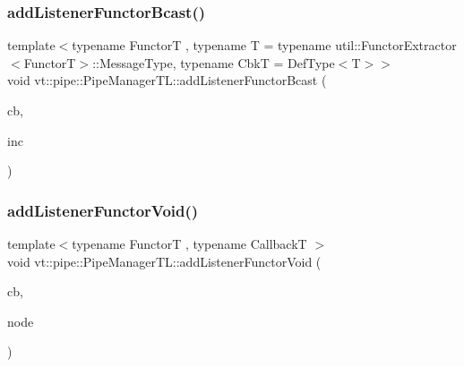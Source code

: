 \subsubsection{\texorpdfstring{add\+Listener\+Functor\+Bcast()}{addListenerFunctorBcast()}\hspace{0.1cm}{\footnotesize\ttfamily [2/2]}}
{\footnotesize\ttfamily template$<$typename FunctorT , typename T  = typename util\+::\+Functor\+Extractor$<$\+Functor\+T$>$\+::\+Message\+Type, typename CbkT  = Def\+Type$<$\+T$>$$>$ \\
void vt\+::pipe\+::\+Pipe\+Manager\+T\+L\+::add\+Listener\+Functor\+Bcast (\begin{DoxyParamCaption}\item[{CbkT const \&}]{cb,  }\item[{bool const \&}]{inc }\end{DoxyParamCaption})}

\mbox{\label{structvt_1_1pipe_1_1_pipe_manager_t_l_a12039964ec1deb173f0ee83ad4c8a543}} 
\subsubsection{\texorpdfstring{add\+Listener\+Functor\+Void()}{addListenerFunctorVoid()}\hspace{0.1cm}{\footnotesize\ttfamily [1/2]}}
{\footnotesize\ttfamily template$<$typename FunctorT , typename CallbackT $>$ \\
void vt\+::pipe\+::\+Pipe\+Manager\+T\+L\+::add\+Listener\+Functor\+Void (\begin{DoxyParamCaption}\item[{CallbackT const \&}]{cb,  }\item[{\hyperlink{namespacevt_a866da9d0efc19c0a1ce79e9e492f47e2}{Node\+Type} const \&}]{node }\end{DoxyParamCaption})}

\mbox{\label{structvt_1_1pipe_1_1_pipe_manager_t_l_a12cd5abf9d9a082369419a5cc5b7b0f8}} 
